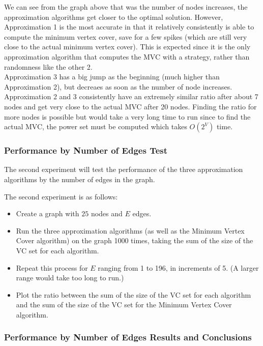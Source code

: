 \documentclass[12pt]{article}
\begin{document}
We can see from the graph above that was the number of nodes increases, the approximation algorithms get closer to the optimal solution. However, Approximation 1 is the most accurate in that it relatively consistently is able to compute the minimum vertex cover, save for a few spikes (which are still very close to the actual minimum vertex cover). This is expected since it is the only approximation algorithm that computes the MVC with a strategy, rather than randomness like the other 2. \\

Approximation 3 has a big jump as the beginning (much higher than Approximation 2), but decreaes as soon as the number of node increases. Approximation 2 and 3 consistently have an extremely similar ratio after about 7 nodes and get very close to the actual MVC after 20 nodes. Finding the ratio for more nodes is possible but would take a very long time to run since to find the actual MVC, the power set must be computed which takes $O(2^V)$ time. \\

\subsubsection{Performance by Number of Edges Test}

The second experiment will test the performance of the three approximation algorithms by the number of edges in the graph.

The second experiment is as follows:

\begin{itemize}
    \item Create a graph with $25$ nodes and $E$ edges.
    \item Run the three approximation algorithms (as well as the Minimum Vertex Cover algorithm) on the graph 1000 times, taking the sum of the size of the VC set for each algorithm.
    \item Repeat this process for $E$ ranging from 1 to 196, in increments of 5. (A larger range would take too long to run.)
    \item Plot the ratio between the sum of the size of the VC set for each algorithm and the sum of the size of the VC set for the Minimum Vertex Cover algorithm.
\end{itemize}
\newpage
\subsubsection{Performance by Number of Edges Results and Conclusions}
\end{document}
